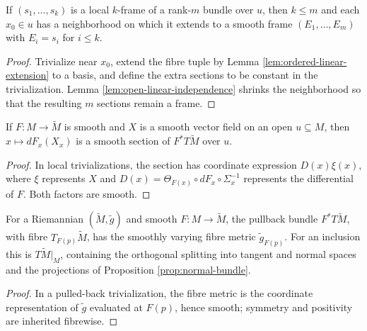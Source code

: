 \begin{lemma}
\label{lem:partial-frame-extension}
\leanok
{}
If $(s_1,\ldots,s_k)$ is a local $k$-frame of a rank-$m$ bundle over $u$, then $k\le m$ and each $x_0\in u$ has a neighborhood on which it extends to a smooth frame $(E_1,\ldots,E_m)$ with $E_i=s_i$ for $i\le k$.
\end{lemma}
\begin{proof}
\leanok
\sketch Trivialize near $x_0$, extend the fibre tuple by Lemma \ref{lem:ordered-linear-extension} to a basis, and define the extra sections to be constant in the trivialization. Lemma \ref{lem:open-linear-independence} shrinks the neighborhood so that the resulting $m$ sections remain a frame.
\end{proof}

\begin{lemma}
\label{lem:pushforward-smooth}
\leanok
{}
If $F:M\to\widetilde M$ is smooth and $X$ is a smooth vector field on an open $u\subseteq M$, then $x\mapsto dF_x(X_x)$ is a smooth section of $F^*T\widetilde M$ over $u$.
\end{lemma}
\begin{proof}
\leanok
\sketch In local trivializations, the section has coordinate expression $D(x)\xi(x)$, where $\xi$ represents $X$ and $D(x)=\Theta_{F(x)}\circ dF_x\circ\Sigma_x^{-1}$ represents the differential of $F$. Both factors are smooth.
\end{proof}

\begin{lemma}
\label{lem:ambient-tangent-bundle-riemannian}
\leanok
{}
For a Riemannian $(\widetilde M,\widetilde g)$ and smooth $F:M\to\widetilde M$, the pullback bundle $F^*T\widetilde M$, with fibre $T_{F(p)}\widetilde M$, has the smoothly varying fibre metric $\widetilde g_{F(p)}$. For an inclusion this is $T\widetilde M|_M$, containing the orthogonal splitting into tangent and normal spaces and the projections of Proposition \ref{prop:normal-bundle}.
\end{lemma}
\begin{proof}
\leanok
{}
\sketch In a pulled-back trivialization, the fibre metric is the coordinate representation of $\widetilde g$ evaluated at $F(p)$, hence smooth; symmetry and positivity are inherited fibrewise.
\end{proof}

